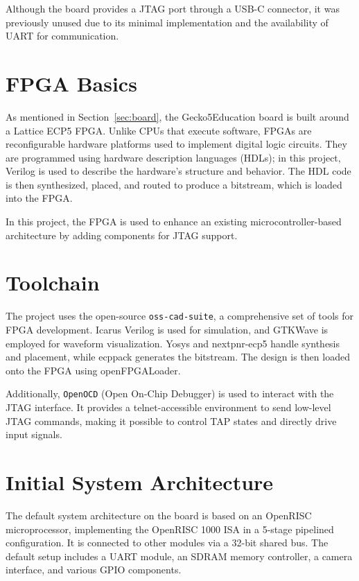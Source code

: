 \documentclass[a4paper,11pt,oneside]{report}
\newcommand{\boardName}{Gecko5Education \xspace}
\begin{document}
Although the board provides a JTAG port through a USB-C connector,  
it was previously unused due to its minimal implementation and  
the availability of UART for communication.  

\section{FPGA Basics}

As mentioned in Section~\ref{sec:board}, the \boardName board is built around a Lattice ECP5 FPGA.  
Unlike CPUs that execute software, FPGAs are reconfigurable hardware platforms  
used to implement digital logic circuits.  
They are programmed using hardware description languages (HDLs);  
in this project, Verilog is used to describe the hardware's structure and behavior.  
The HDL code is then synthesized, placed, and routed to produce a bitstream,  
which is loaded into the FPGA.  

In this project, the FPGA is used to enhance an existing microcontroller-based architecture  
by adding components for JTAG support.  

\section{Toolchain}
\label{sec:toolchain}

The project uses the open-source \texttt{oss-cad-suite},  
a comprehensive set of tools for FPGA development.  
Icarus Verilog is used for simulation,  
and GTKWave is employed for waveform visualization.  
Yosys and nextpnr-ecp5 handle synthesis and placement,  
while ecppack generates the bitstream.  
The design is then loaded onto the FPGA using openFPGALoader.  

Additionally, \texttt{OpenOCD} (Open On-Chip Debugger) is used  
to interact with the JTAG interface.  
It provides a telnet-accessible environment to send low-level JTAG commands,  
making it possible to control TAP states and directly drive input signals.  

\section{Initial System Architecture}

The default system architecture on the board is based on an OpenRISC microprocessor,  
implementing the OpenRISC 1000 ISA in a 5-stage pipelined configuration.  
It is connected to other modules via a 32-bit shared bus.  
The default setup includes a UART module, an SDRAM memory controller,  
a camera interface, and various GPIO components.  
\end{document}
